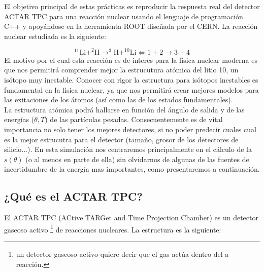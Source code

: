 \documentclass[12pt,a4paper]{article}
\numberwithin{equation}{section}
\numberwithin{figure}{section}
\begin{document}
El objetivo principal de estas prácticas es reproducir la respuesta real del detector ACTAR TPC para una reacción nuclear usando el lenguaje de programación C++ y apoyándose en la herramienta ROOT diseñada por el CERN. La reacción nuclear estudiada es la siguiente:

\begin{equation}
    ^{11}\mathrm{Li}+^2\mathrm{H} \rightarrow ^3\mathrm{H}+^{10}\mathrm{Li} \Longleftrightarrow 1 + 2 \rightarrow 3 + 4
\end{equation}
El motivo por el cual esta reacción es de interes para la física nuclear moderna es que nos permitirá comprender mejor la estrucutura atómica del litio 10, un isótopo muy inestable. Conocer con rigor la estructura para isótopos inestables es fundamental en la fisica nuclear, ya que nos permitirá crear mejores modelos para las exitaciones de los átomos (así como las de los estados fundamentales).  \\

La estructura atómica podrá hallarse en función del ángulo de salida y de las energías ($\theta, T$) de las partículas pesadas. Consecuentemente es de vital importancia no solo tener los mejores detectores, si no poder predecir cuales cual es la mejor estrucutra para el detector (tamaño, grosor de los detectores de silicio...). En esta simulación nos centraremos principalmente en el cálculo de la $s(\theta)$ (o al menos en parte de ella) sin olvidarnos de algunas de las fuentes de incertidumbre de la energía mas importantes, como presentaremos a continuación. 

\subsection{¿Qué es el ACTAR TPC?}

El ACTAR TPC (ACtive TARGet and Time Projection Chamber) es un detector gaseoso activo \footnote{un detector gaseoso activo quiere decir que el gas actúa dentro del a reacción.} de reacciones nucleares. La estructura es la siguiente: \\
\end{document}
